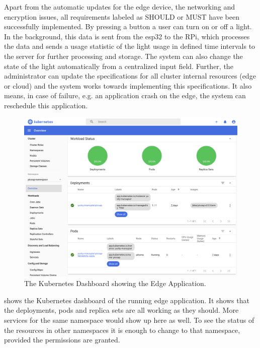 Apart from the automatic updates for the edge device, the networking and encryption issues, all requirements labeled as SHOULD or MUST have been successfully implemented. By pressing a button a user can turn on or off a light. In the background, this data is sent from the esp32 to the RPi, which processes the data and sends a usage statistic of the light usage in defined time intervals to the server for further processing and storage. The system can also change the state of the light automatically from a centralized input field. Further, the administrator can update the specifications for all cluster internal resources (edge or cloud) and the system works towards implementing this specifications. It also means, in case of failure, e.g. an application crash on the edge, the system can reschedule this application. 

\begin{figure}[!ht]
    \centering
    \includegraphics[width=\textwidth]{figures/dashboardK8s.png}
    \caption{The Kubernetes Dashboard showing the Edge Application.}
    \label{fig:dashboarK8s}
\end{figure}

 shows the Kubernetes dashboard of the running edge application. It shows that the deployments, pods and replica sets are all working as they should. More services for the same namespace would show up here as well. To see the status of the resources in other namespaces it is enough to change to that namespace, provided the permissions are granted.

